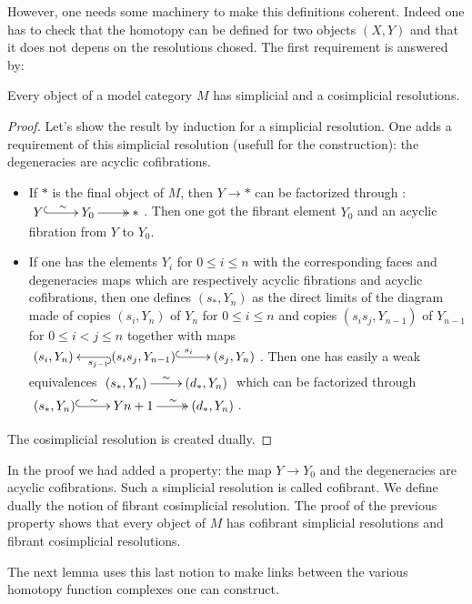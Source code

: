 However, one needs some machinery to make this definitions coherent. Indeed one has to check that the homotopy can be defined for two objects $(X,Y)$ and that it does not depens on the resolutions chosed. The first requirement is answered by: 

\begin{prop}
Every object of a model category $M$ has simplicial and a cosimplicial resolutions.
\end{prop}

\begin{proof}
Let's show the result by induction for a simplicial resolution. One adds a requirement of this simplicial resolution (usefull for the construction): the degeneracies are acyclic cofibrations.
\begin{itemize}
\item If $*$ is the final object of $M$, then $Y \rightarrow *$ can be factorized through : $\xymatrix{{Y} \ar@{^{(}->}[r]^{\sim} & {Y_0} \ar@{->>}[r] & {*}}$. Then one got the fibrant element $Y_0$ and an acyclic fibration from $Y$ to $Y_0$.
\item If one has the elements $Y_i$ for $0 \leq i \leq n$ with the corresponding faces and degeneracies maps which are respectively acyclic fibrations and acyclic cofibrations, then one defines $(s_*,Y_n)$ as the direct limits of the diagram made of copies $(s_i,Y_n)$ of $Y_n$ for $0 \leq i \leq n$ and copies $(s_i s_j, Y_{n-1})$ of $Y_{n-1}$ for $0 \leq i < j \leq n$ together with maps $\xymatrix{{(s_i,Y_n)}  & {(s_i s_j, Y_{n-1})} \ar@{^{(}->}[l]^{s_{j-1}} \ar@{^{(}->}[r]^{s_{i}} & {(s_j,Y_n)}}$. Then one has easily a weak equivalences $\xymatrix{{(s_*,Y_n)} \ar[r]^{\sim} & {(d_*,Y_n)}}$ which can be factorized through $\xymatrix{{(s_*,Y_n)} \ar@{^{(}->}[r]^{\sim} &{Y{n+1}} \ar@{->>}[r]^{\sim} & {(d_*,Y_n)}}$.
\end{itemize}
The cosimplicial resolution is created dually.
\end{proof}


\begin{rmk}
In the proof we had added a property: the map $Y \rightarrow Y_0$ and the degeneracies are acyclic cofibrations. Such a simplicial resolution is called cofibrant. We define dually the notion of fibrant cosimplicial resolution. The proof of the previous property shows that every object of $M$ has cofibrant simplicial resolutions and fibrant cosimplicial resolutions.
\end{rmk}

The next lemma uses this last notion to make links between the various homotopy function complexes one can construct.

